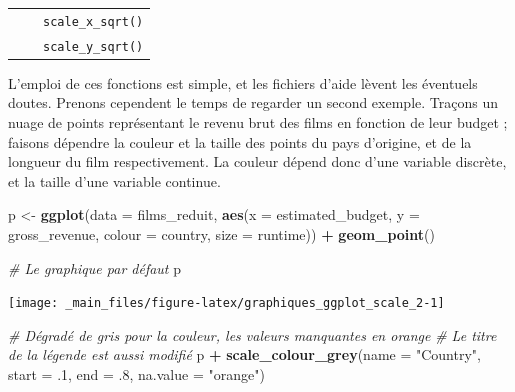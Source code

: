 \documentclass[
  11pt,
]{book}
\newenvironment{Shaded}{\begin{snugshade}}{\end{snugshade}}
\newcommand{\CommentTok}[1]{\textcolor[rgb]{0.56,0.35,0.01}{\textit{#1}}}
\newcommand{\DataTypeTok}[1]{\textcolor[rgb]{0.13,0.29,0.53}{#1}}
\newcommand{\FloatTok}[1]{\textcolor[rgb]{0.00,0.00,0.81}{#1}}
\newcommand{\KeywordTok}[1]{\textcolor[rgb]{0.13,0.29,0.53}{\textbf{#1}}}
\newcommand{\NormalTok}[1]{#1}
\newcommand{\OperatorTok}[1]{\textcolor[rgb]{0.81,0.36,0.00}{\textbf{#1}}}
\newcommand{\StringTok}[1]{\textcolor[rgb]{0.31,0.60,0.02}{#1}}
\numberwithin{equation}{section}
\numberwithin{countremarque}{section}
\begin{document}
\begin{longtable}[]{@{}lll@{}}
\begin{minipage}[t]{0.22\columnwidth}
\strut
\end{minipage} & \begin{minipage}[t]{0.35\columnwidth}\raggedright
\strut
\end{minipage} & \begin{minipage}[t]{0.35\columnwidth}\raggedright
\texttt{scale\_x\_sqrt()}\strut
\end{minipage}\tabularnewline
\begin{minipage}[t]{0.22\columnwidth}\raggedright
\strut
\end{minipage} & \begin{minipage}[t]{0.35\columnwidth}\raggedright
\strut
\end{minipage} & \begin{minipage}[t]{0.35\columnwidth}\raggedright
\texttt{scale\_y\_sqrt()}\strut
\end{minipage}\tabularnewline
\bottomrule
\end{longtable}

L'emploi de ces fonctions est simple, et les fichiers d'aide lèvent les éventuels doutes. Prenons cependent le temps de regarder un second exemple. Traçons un nuage de points représentant le revenu brut des films en fonction de leur budget ; faisons dépendre la couleur et la taille des points du pays d'origine, et de la longueur du film respectivement. La couleur dépend donc d'une variable discrète, et la taille d'une variable continue.

\begin{Shaded}
\begin{Highlighting}[]
\NormalTok{p \textless{}{-}}\StringTok{ }\KeywordTok{ggplot}\NormalTok{(}\DataTypeTok{data =}\NormalTok{ films\_reduit,}
            \KeywordTok{aes}\NormalTok{(}\DataTypeTok{x =}\NormalTok{ estimated\_budget,}
                \DataTypeTok{y =}\NormalTok{ gross\_revenue,}
                \DataTypeTok{colour =}\NormalTok{ country,}
                \DataTypeTok{size =}\NormalTok{ runtime)) }\OperatorTok{+}
\StringTok{  }\KeywordTok{geom\_point}\NormalTok{()}

\CommentTok{\# Le graphique par défaut}
\NormalTok{p}
\end{Highlighting}
\end{Shaded}

\begin{center}\texttt{[image: \_main\_files/figure-latex/graphiques\_ggplot\_scale\_2-1]} \end{center}

\begin{Shaded}
\begin{Highlighting}[]
\CommentTok{\# Dégradé de gris pour la couleur, les valeurs manquantes en orange}
\CommentTok{\# Le titre de la légende est aussi modifié}
\NormalTok{p }\OperatorTok{+}\StringTok{ }\KeywordTok{scale\_colour\_grey}\NormalTok{(}\DataTypeTok{name =} \StringTok{"Country"}\NormalTok{, }\DataTypeTok{start =} \FloatTok{.1}\NormalTok{, }\DataTypeTok{end =} \FloatTok{.8}\NormalTok{,}
                      \DataTypeTok{na.value =} \StringTok{"orange"}\NormalTok{)}
\end{Highlighting}
\end{Shaded}
\end{document}
